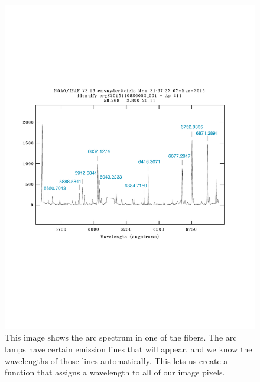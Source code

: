 \documentclass[12pt]{report}
\begin{document}
\begin{figure}[h]
\centering
\includegraphics[scale=0.6]{wavelength_example_new}
\caption[Example of the wavelength solution]{This image shows the arc spectrum in one of the fibers. The arc lamps have certain emission lines that will appear, and we know the wavelengths of those lines automatically. This lets us create a function that assigns a wavelength to all of our image pixels.}
\label{fig:wave}
\end{figure}
\end{document}
